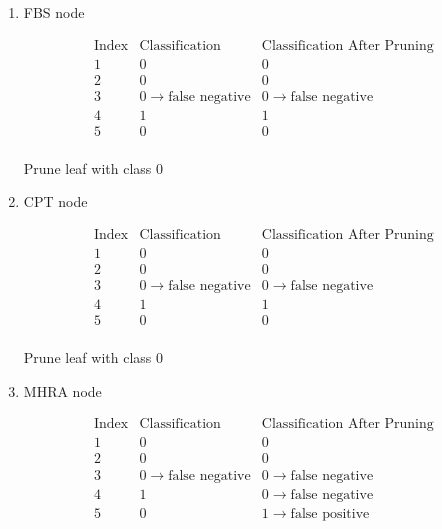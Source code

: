 \begin{enumerate}
\begin{enumerate}
\begin{enumerate}
					\item{FBS node}
					
						\[
							\begin{array}{c|l|l}
								\text{Index} & \text{Classification} & \text{Classification After Pruning} \\
								\hline
								1 & 0 & 0 \\
								2 & 0 & 0 \\
								3 & 0 \rightarrow \text{false negative} & 0 \rightarrow \text{false negative} \\
								4 & 1 & 1 \\
								5 & 0 & 0 \\
							\end{array}
						\]
						
						Prune leaf with class 0
					
					\item{CPT node}
					
						\[
							\begin{array}{c|l|l}
								\text{Index} & \text{Classification} & \text{Classification After Pruning} \\
								\hline
								1 & 0 & 0 \\
								2 & 0 & 0 \\
								3 & 0 \rightarrow \text{false negative} & 0 \rightarrow \text{false negative} \\
								4 & 1 & 1 \\
								5 & 0 & 0 \\
							\end{array}
						\]
						
						Prune leaf with class 0
					
					\item{MHRA node}
					
						\[
							\begin{array}{c|l|l}
								\text{Index} & \text{Classification} & \text{Classification After Pruning} \\
								\hline
								1 & 0 & 0 \\
								2 & 0 & 0 \\
								3 & 0 \rightarrow \text{false negative} & 0 \rightarrow \text{false negative} \\
								4 & 1 & 0 \rightarrow \text{false negative} \\
								5 & 0 & 1 \rightarrow \text{false positive}  \\
							\end{array}
						\]
						

\end{enumerate}
\end{enumerate}
\end{enumerate}
